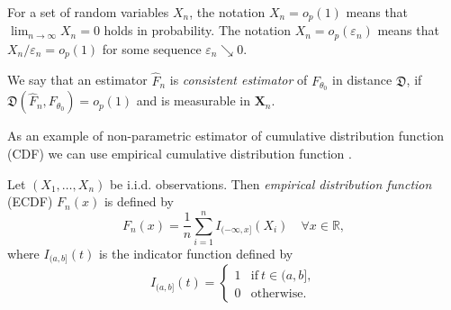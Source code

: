 \begin{definition} %
For a set of random variables $X_n$, the notation $X_n = o_p(1)$ means that $\lim_{n \rightarrow \infty } X_n = 0$ holds in probability. The notation $X_n = o_p(\varepsilon_n)$ means that $X_n/\varepsilon_n = o_p(1)$ for some sequence $\varepsilon_n \searrow 0$.
\end{definition} 

\begin{definition} %
We say that an estimator $\hat{F}_n$ is {\em consistent estimator} of $F_{\theta_0}$ in distance $\mathfrak{D}$, if $\mathfrak{D}(\hat{F}_n, F_{\theta_0}) = o_p (1)$ and is measurable in $\mathbf{X}_n$.
\end{definition}


\noindent As an example of non-parametric estimator of cumulative distribution function (CDF)  we can use empirical cumulative distribution function .

\begin{definition}
	Let $(X_1, \ldots,X_n)$ be i.i.d. observations. Then \emph{empirical distribution function} (ECDF)  $F_n(x)$ is defined by 
	\begin{equation}
	F_n(x) = \frac{1}{n} \sum_{i=1}^n I_{(-\infty,x]}(X_i) \quad \forall x \in \mathbb{R},
		\label{eq:ecdf}
	\end{equation}
	where $I_{(a,b]}(t)$ is the indicator function defined by 
	\begin{equation}
	I_{(a,b]}(t) = 
		\begin{cases}
			1 & \mathrm{if } \: t \in (a,b], \\
			0 & \mathrm{otherwise}.
		\end{cases}		
	\end{equation}
	\label{def:ecdf}	
\end{definition}

